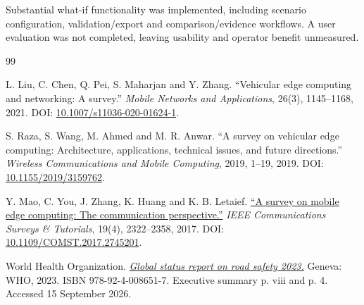\documentclass[12pt,a4paper]{article}
\begin{document}
Substantial what-if functionality was implemented, including scenario configuration, validation/export and comparison/evidence workflows. A user evaluation was not completed, leaving usability and operator benefit unmeasured.





\FloatBarrier\singlespacing{}\begin{thebibliography}{99}
\setlength{\itemsep}{0pt}\setlength{\parskip}{0pt}

 L. Liu, C. Chen, Q. Pei, S. Maharjan and Y. Zhang. ``Vehicular edge computing and networking: A survey.'' \emph{Mobile Networks and Applications}, 26(3), 1145--1168, 2021. DOI: \href{\detokenize{https://doi.org/10.1007/s11036-020-01624-1}}{10.1007/s11036-020-01624-1}.

 S. Raza, S. Wang, M. Ahmed and M. R. Anwar. ``A survey on vehicular edge computing: Architecture, applications, technical issues, and future directions.'' \emph{Wireless Communications and Mobile Computing}, 2019, 1--19, 2019. DOI: \href{\detokenize{https://doi.org/10.1155/2019/3159762}}{10.1155/2019/3159762}.

 Y. Mao, C. You, J. Zhang, K. Huang and K. B. Letaief. \href{\detokenize{https://arxiv.org/abs/1701.01090}}{``A survey on mobile edge computing: The communication perspective.''} \emph{IEEE Communications Surveys \& Tutorials}, 19(4), 2322--2358, 2017. DOI: \href{\detokenize{https://doi.org/10.1109/COMST.2017.2745201}}{10.1109/COMST.2017.2745201}.

 World Health Organization. \href{\detokenize{https://iris.who.int/server/api/core/bitstreams/46275f9f-ef66-4892-8ddd-a496ef8c1b74/content}}{\emph{Global status report on road safety 2023.}} Geneva: WHO, 2023. ISBN 978-92-4-008651-7. Executive summary p. viii and p. 4. Accessed 15 September 2026.


\end{thebibliography}
\end{document}
